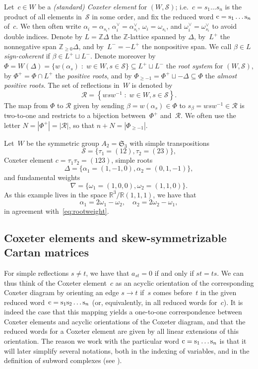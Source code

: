 \documentclass[ALCO,Unicode,ThmDefs]{cedram}
\newcommand{\ZZ}{\mathbb{Z}}
\newcommand{\RR}{\mathbb{R}}
\newcommand{\Phiplus}{\Phi^+}
\newcommand{\Phipm}{\Phi_{\geq -1}}
\newcommand{\refl}{\mathcal{R}}
\newcommand{\Dfn}[1]{\emph{#1}}
\newcommand{\sq}[1]{{\rm #1}}
\newcommand{\s}{\sq{s}}
\newcommand{\sref}{\mathcal{S}}
\renewcommand{\c}{\sq{c}}
\newcommand{\set}[2]{\left\{ #1 \;:\; #2 \right\}}
\newcommand{\bigset}[2]{\big\{ #1 \;:\; #2 \big\}}
\begin{document}
Let~$c \in W$ be a \Dfn{(standard) Coxeter element} for $(W,\sref)$; i.e.~$c = s_1\dots s_n$ is the product of all elements in~$\sref$ in some order, and fix the reduced word $\c = \s_1\dots\s_n$ of~$c$. We then often write $\alpha_i = \alpha_{s_i}$, $\alpha_i^\vee = \alpha_{s_i}^\vee$, $\omega_i = \omega_{s_i}$, and $\omega_i^\vee = \omega_{s_i}^\vee$ to avoid double indices. Denote by $L = \ZZ\Delta$ the $\ZZ$-lattice spanned by $\Delta$, by~$L^+$ the nonnegative span $\ZZ_{\geq 0}\Delta$, and by~$L^- = -L^+$ the nonpositive span. We call $\beta \in L$ \Dfn{sign-coherent} if $\beta \in L^+ \sqcup L^-$. Denote moreover by $\Phi = W(\Delta) = \bigset{w(\alpha_s)}{w \in W, s \in \sref} \subseteq L^+ \sqcup L^-$ the \Dfn{root system} for $(W,\sref)$, by $\Phiplus = \Phi \cap L^+$ the \Dfn{positive roots}, and by $\Phipm = \Phiplus \sqcup -\Delta \subseteq \Phi$ the \Dfn{almost positive roots}. The set of reflections in~$W$ is denoted by
\[
\refl = \set{ wsw^{-1} }{ w \in W, s \in \sref}.
\]
The map from $\Phi$ to $\refl$ given by sending $\beta = w(\alpha_s) \in \Phi$ to $s_\beta = w s w^{-1} \in \refl$ is two-to-one and restricts to a bijection between~$\Phiplus$ and~$\refl$. We often use the letter $N = |\Phiplus| = | \refl |$, so that $n+N = |\Phipm|$.

\begin{exem}\label{ex:A2}
Let~$W$ be the symmetric group $A_2 = \mathfrak{S}_3$ with simple transpositions
\[
\sref=\big\{\tau_1 = (12),\tau_2 = (23)\big\},
\]
Coxeter element $c = \tau_1\tau_2 = (123)$, simple roots
\[
\Delta = \{ \alpha_1 = (1,-1,0), \alpha_2 = (0,1,-1) \},
\]
and fundamental weights
\[
\nabla = \{ \omega_1 = (1,0,0), \omega_2 = (1,1,0) \}.
\]
As this example lives in the space $\RR^3 \big/ \RR(1,1,1)$, we have that
\[
\alpha_1 = 2\omega_1-\omega_2, \quad \alpha_2 = 2\omega_2-\omega_1,
\]
in agreement with~\eqref{eq:rootweight}.
\end{exem}

\subsection{Coxeter elements and skew-symmetrizable Cartan matrices}\label{sec:coxeterelement}

For simple reflections $s \neq t$, we have that $a_{st} = 0$ if and only if $st = ts$. We can thus think of the Coxeter element~$c$ as an acyclic orientation of the corresponding Coxeter diagram by orienting an edge $s \rightarrow t$ if~$s$ comes before~$t$ in the given reduced word~$\c = \s_1 \s_2 \dots \s_n$ (or, equivalently, in all reduced words for~$c$). It is indeed the case that this mapping yields a one-to-one correspondence between Coxeter elements and acyclic orientations of the Coxeter diagram, and that the reduced words for a Coxeter element are given by all linear extensions of this orientation. The reason we work with the particular word $\c = \s_1\dots\s_n$ is that it will later simplify several notations, both in the indexing of variables, and in the definition of subword complexes (see ).
\end{document}
